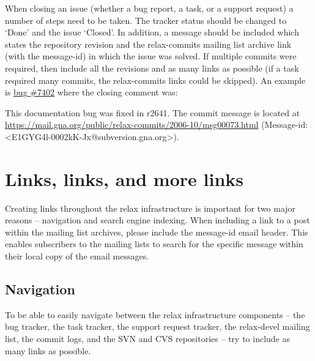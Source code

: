 When closing an issue (whether a bug report, a task, or a support request) a number of steps need to be taken.  The tracker status should be changed to `Done' and the issue `Closed'.  In addition, a message should be included which states the repository revision and the relax-commits mailing list archive link (with the message-id) in which the issue was solved.  If multiple commits were required, then include all the revisions and as many links as possible (if a task required many commits, the relax-commits links could be skipped).  An example is \href{https://gna.org/bugs/?7402}{bug \#7402} where the closing comment was:

\begin{exampleenv}
This documentation bug was fixed in r2641. The commit message is located at \href{https://mail.gna.org/public/relax-commits/2006-10/msg00073.html}{https://mail.gna.org/public/relax-commits/2006-10/msg00073.html} (Message-id: <E1GYG4l-0002kK-Jx@subversion.gna.org>).
\end{exampleenv}




\section{Links, links, and more links}

Creating links throughout the relax infrastructure is important for two major reasons -- navigation and search engine indexing.  When including a link to a post within the mailing list archives, please include the message-id email header.  This enables subscribers to the mailing lists to search for the specific message within their local copy of the email messages.



\subsection{Navigation}

To be able to easily navigate between the relax infrastructure components -- the bug tracker, the task tracker, the support request tracker, the relax-devel mailing list, the commit logs, and the SVN and CVS repositories -- try to include as many links as possible.

